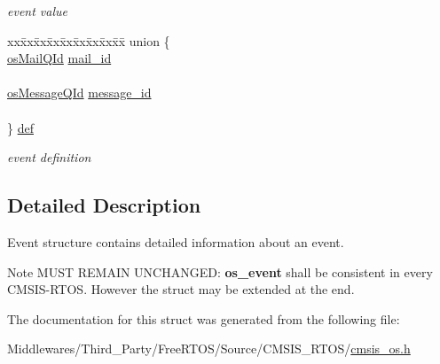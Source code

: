 \begin{DoxyCompactItemize}
\begin{tabbing}
\end{tabbing}\begin{DoxyCompactList}\small\item\em event value \end{DoxyCompactList}\item 
\mbox{\label{structos_event_a1931bb6b9ae7646b39364333917e1f12}} 
\begin{tabbing}
xx\=xx\=xx\=xx\=xx\=xx\=xx\=xx\=xx\=\kill
union \{\\
\>\mbox{\hyperlink{cmsis__os_8h_a1dac049fb7725a8af8b26c71cbb373b5}{osMailQId}} \mbox{\hyperlink{structos_event_ac86175a4b1706bee596f3018322df26e}{mail\_id}}\\
\>\\
\>\mbox{\hyperlink{cmsis__os_8h_a8c191fd2b1369c8942873496a186a022}{osMessageQId}} \mbox{\hyperlink{structos_event_af394cbe21dde7377974e63af38cd87b0}{message\_id}}\\
\>\\
\} \mbox{\hyperlink{structos_event_a1931bb6b9ae7646b39364333917e1f12}{def}}\\

\end{tabbing}\begin{DoxyCompactList}\small\item\em event definition \end{DoxyCompactList}\end{DoxyCompactItemize}


\subsection{Detailed Description}
Event structure contains detailed information about an event. \begin{DoxyNote}{Note}
M\+U\+ST R\+E\+M\+A\+IN U\+N\+C\+H\+A\+N\+G\+ED\+: {\bfseries os\+\_\+event} shall be consistent in every C\+M\+S\+I\+S-\/\+R\+T\+OS. However the struct may be extended at the end. 
\end{DoxyNote}


The documentation for this struct was generated from the following file\+:\begin{DoxyCompactItemize}
\item 
Middlewares/\+Third\+\_\+\+Party/\+Free\+R\+T\+O\+S/\+Source/\+C\+M\+S\+I\+S\+\_\+\+R\+T\+O\+S/\mbox{\hyperlink{cmsis__os_8h}{cmsis\+\_\+os.\+h}}\end{DoxyCompactItemize}
